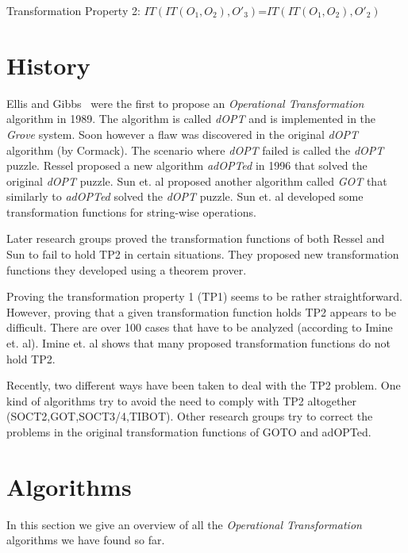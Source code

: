 \documentclass[11pt,a4paper]{article}
\begin{document}
\begin{defn}
Transformation Property 2: 
$IT(IT(O_{1},O_{2}),O'_{3})$=$IT(IT(O_{1},O_{2}),O'_{2})$
\end{defn}


\section{History}
{Ellis and Gibbs}~\cite{ellis} were the first to propose an \emph{Operational Transformation} algorithm in 1989. The algorithm is called \emph{dOPT} and is implemented in the \emph{Grove} system. Soon however a flaw was discovered in the original \emph{dOPT} algorithm (by Cormack\cite{cormack95a}). The scenario where \emph{dOPT} failed is called the \emph{dOPT} puzzle. Ressel\cite{ressel:adopted} proposed a new algorithm \emph{adOPTed} in 1996 that solved the original \emph{dOPT} puzzle. {Sun et. al}\cite{sun:achieving} proposed another algorithm called \emph{GOT} that similarly to \emph{adOPTed} solved the \emph{dOPT} puzzle. {Sun et. al}\cite{sun:reversible} developed some transformation functions for string-wise operations.

Later research groups\cite{imine:development}\cite{imine:achieving} proved the transformation functions of both Ressel\cite{ressel:adopted} and Sun\cite{sun:achieving} to fail to hold TP2 in certain situations. They proposed new transformation functions they developed using a theorem prover. 

Proving the transformation property 1 (TP1) seems to be rather straightforward. However, proving that a given transformation function holds TP2 appears to be difficult. There are over 100 cases that have to be analyzed (according to {Imine et. al}\cite{imine:achieving}). Imine et. al shows that many proposed transformation functions do not hold TP2. 

Recently, two different ways have been taken to deal with the TP2 problem. One kind of algorithms try to avoid the need to comply with TP2 altogether (SOCT2\cite{},GOT\cite{},SOCT3/4\cite{suleiman00},TIBOT\cite{tibot}). Other research groups try to correct the problems in the original transformation functions of GOTO\cite{} and adOPTed\cite{ressel:adopted}. 


\section{Algorithms}
In this section we give an overview of all the \emph{Operational Transformation} algorithms we have found so far.
\end{document}
